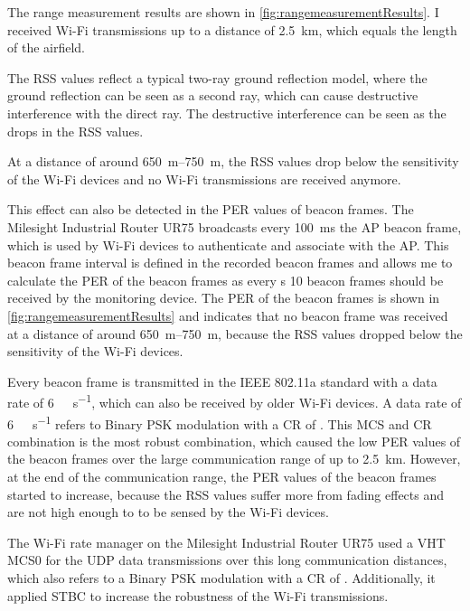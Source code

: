 The range measurement results are shown in \autoref{fig:rangemeasurementResults}.
I received Wi-Fi transmissions up to a distance of \SI{2.5}{\kilo\metre},
which equals the length of the airfield.

The \ac{RSS} values reflect a typical two-ray ground reflection model, where the ground reflection can be seen as a second ray,
which can cause destructive interference with the direct ray.
The destructive interference can be seen as the drops in the \ac{RSS} values.

At a distance of around \SIrange{650}{750}{\metre}, the \ac{RSS} values drop below the sensitivity of the Wi-Fi devices and
no Wi-Fi transmissions are received anymore.

This effect can also be detected in the \ac{PER} values of beacon frames.
The Milesight Industrial Router UR75 broadcasts every \SI{100}{\milli\second} the \ac{AP} beacon frame, which is used by Wi-Fi devices to
authenticate and associate with the \ac{AP}.
This beacon frame interval is defined in the recorded beacon frames and allows me to
calculate the \ac{PER} of the beacon frames as every \si{\second} \num{10} beacon frames should be received by the monitoring device.
The \ac{PER} of the beacon frames is shown in \autoref{fig:rangemeasurementResults} and indicates that no beacon frame was received at
a distance of around \SIrange{650}{750}{\metre}, because the \ac{RSS} values dropped below the sensitivity of the Wi-Fi devices.

Every beacon frame is transmitted in the IEEE 802.11a standard with a data rate of \SI{6}{\mega\bit\per\second}, which can also be received
by older Wi-Fi devices.
A data rate of \SI{6}{\mega\bit\per\second} refers to Binary \ac{PSK} modulation with a \ac{CR} of  \cite{ieee_standard_1999}.
This \ac{MCS} and \ac{CR} combination is the most robust combination, which caused the low \ac{PER} values of the beacon frames over
the large communication range of up to \SI{2.5}{\kilo\metre}.
However, at the end of the communication range, the \ac{PER} values of the beacon frames
started to increase, because the \ac{RSS} values suffer more from fading effects and are not high enough to
to be sensed by the Wi-Fi devices.

The Wi-Fi rate manager on the Milesight Industrial Router UR75 used a \ac{VHT} \ac{MCS}0 for the \ac{UDP} data transmissions over this long communication distances, which also refers to a Binary \ac{PSK} modulation with a \ac{CR} of .
Additionally, it applied \ac{STBC} to increase the robustness of the Wi-Fi transmissions.

